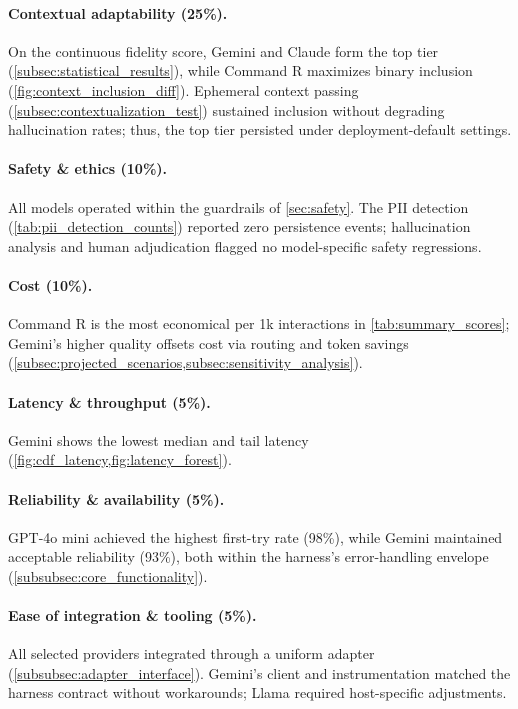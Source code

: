 \paragraph{Contextual adaptability (25\%).} On the continuous fidelity score, Gemini and Claude form the top tier (\cref{subsec:statistical_results}), while Command R maximizes binary inclusion (\cref{fig:context_inclusion_diff}). Ephemeral context passing (\cref{subsec:contextualization_test}) sustained inclusion without degrading hallucination rates; thus, the top tier persisted under deployment-default settings.

\paragraph{Safety \& ethics (10\%).} All models operated within the guardrails of \cref{sec:safety}. The PII detection (\cref{tab:pii_detection_counts}) reported zero persistence events; hallucination analysis and human adjudication flagged no model-specific safety regressions.

\paragraph{Cost (10\%).} Command R is the most economical per 1k interactions in \cref{tab:summary_scores}; Gemini's higher quality offsets cost via routing and token savings (\cref{subsec:projected_scenarios,subsec:sensitivity_analysis}).

\paragraph{Latency \& throughput (5\%).} Gemini shows the lowest median and tail latency (\cref{fig:cdf_latency,fig:latency_forest}).

\paragraph{Reliability \& availability (5\%).} GPT-4o mini achieved the highest first-try rate (98\%), while Gemini maintained acceptable reliability (93\%), both within the harness's error-handling envelope (\cref{subsubsec:core_functionality}).

\paragraph{Ease of integration \& tooling (5\%).} All selected providers integrated through a uniform adapter (\cref{subsubsec:adapter_interface}). Gemini's client and instrumentation matched the harness contract without workarounds; Llama required host-specific adjustments.

